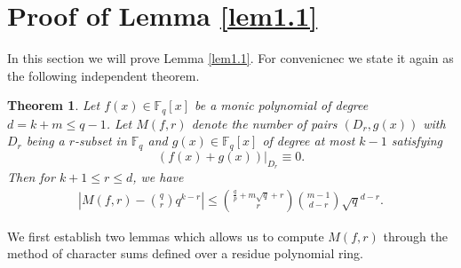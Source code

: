 \documentclass[reqno]{amsart}
\newtheorem{thm}{Theorem}[section]
\theoremstyle{remark}
\numberwithin{equation}{section}
\newcommand{\f}{\mathbb{F}_q}
\begin{document}
\section{Proof of Lemma \ref{lem1.1} }
In this section we will prove Lemma \ref{lem1.1}.
 For convenicnec we state it again as the following independent theorem.
 \begin{thm}\label{thm6.1}
 Let $f(x) \in \f [x]$ be a monic polynomial of degree $d=k+m\leq q-1$. Let $M(f, r)$  denote
the number of pairs $(D_r, g(x))$ with $D_r$ being a $r$-subset in $\f$ and $g(x)\in \f[x]$ of degree at most $k-1$ satisfying
$$ (f(x)+g(x))|_{D_r} \equiv 0.$$ Then for $k+1\leq r\leq d$,  we have
 \begin{align*}
\left| {M(f, r)}-{{q \choose r}q^{k-r}}\right| \leq  {\frac {q}p+m\sqrt{q}+r \choose r}{m-1 \choose d-r} \sqrt{q}^{d-r}.
 \end{align*}
\end{thm}

We first establish two lemmas which
allows us to compute $M(f,r)$ through the method of character sums defined over a residue polynomial ring.
\end{document}
